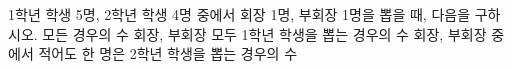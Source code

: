 1학년 학생 5명, 2학년 학생 4명 중에서 회장 1명, 부회장 1명을 뽑을 때, 다음을 구하시오.
 모든 경우의 수
 회장, 부회장 모두 1학년 학생을 뽑는 경우의 수
 회장, 부회장 중에서 적어도 한 명은 2학년 학생을 뽑는 경우의 수
